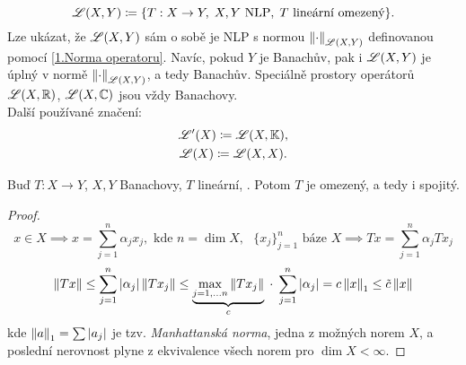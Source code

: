 \begin{definition}

$$
    \mathscr{L}(X, Y)
    \coloneqq
    \{
        T: X \to Y, \;
        X,Y \text{ NLP}, \;
        T \text{ lineární omezený}
    \}.
$$
Lze ukázat, že $\mathscr{L}(X, Y)$ sám o sobě je NLP s normou $\left\lVert\cdot\right\rVert_{\mathscr{L}(X,Y)}$ definovanou pomocí \ref{1.Norma operatoru}. Navíc, pokud $Y$ je Banachův, pak i $\mathscr{L}(X, Y)$ je úplný v normě $\left\lVert\cdot\right\rVert_{\mathscr{L}(X,Y)}$, a tedy Banachův. Speciálně prostory operátorů $\mathscr{L}(X, \mathbb{R})$, $\mathscr{L}(X, \mathbb{C})$ jsou vždy Banachovy.
\\
Další používané značení:
\begin{gather*}
    \mathscr{L}'(X) \coloneqq \mathscr{L}(X, \mathbb{K}), \\
    \mathscr{L}(X) \coloneqq \mathscr{L}(X, X).
\end{gather*}
\end{definition}

\begin{theorem}
Buď $T: X \to Y$, $X,Y$ Banachovy, $T$ lineární, . Potom $T$ je omezený, a tedy i spojitý.
\end{theorem}
\begin{proof}
$$
    x \in X
    \implies
    x = \sum_{j=1}^n \alpha_j x_j, \text{ kde } n = \dim X, \text{ } \{ x_j \}_{j=1}^n \text{ báze } X
    \implies
    Tx = \sum_{j=1}^n \alpha_j T x_j
$$
$$
    \left\lVert Tx\right\rVert
    \leq
    \sum_{j=1}^n |\alpha_j| \left\lVert Tx_j\right\rVert
    \leq
    \underbrace{
        \underset{j=1,\dots n}{\max} \left\lVert Tx_j\right\rVert
    }_{c}
    \; \cdot \;
    \sum_{j=1}^n |\alpha_j|
    =
    c \left\lVert x\right\rVert_1
    \leq
    \Tilde{c} \left\lVert x\right\rVert
$$
kde $\left\lVert a\right\rVert_1 = \sum |a_j|$ je tzv. \textit{Manhattanská norma}, jedna z možných norem $X$, a poslední nerovnost plyne z ekvivalence všech norem pro $\dim X < \infty$.
\end{proof}

